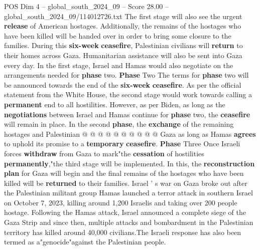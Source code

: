 \begin{textsample}{POS Dim 4 – global\_south\_2024\_09 – Score 28.00 – global\_south\_2024\_09/114012726.txt}
The first stage will also see the urgent \textbf{release} of American hostages.
Additionally, the remains of the hostages who have been killed will be handed over in order to bring some closure to the families.
During this \textbf{six-week} \textbf{ceasefire}, Palestinian civilians will \textbf{return} to their homes across Gaza.
Humanitarian assistance will also be sent into Gaza every day.
In the first stage, Israel and Hamas would also negotiate on the arrangements needed for \textbf{phase} two. \textbf{Phase} Two The terms for \textbf{phase} two will be announced towards the end of the \textbf{six-week} \textbf{ceasefire}.
As per the official statement from the White House, the second stage would work towards calling a \textbf{permanent} end to all hostilities.
However, as per Biden, as long as the \textbf{negotiations} between Israel and Hamas continue for \textbf{phase} two, the \textbf{ceasefire} will remain in place.
In the second \textbf{phase}, the \textbf{exchange} of the remaining hostages and Palestinian @ @ @ @ @ @ @ @ @ @ Gaza as long as Hamas \textbf{agrees} to uphold its promise to a \textbf{temporary} \textbf{ceasefire}. \textbf{Phase} Three Once Israeli forces \textbf{withdraw} from Gaza to mark"the \textbf{cessation} of hostilities \textbf{permanently},"the third stage will be implemented.
In this, the \textbf{reconstruction} \textbf{plan} for Gaza will begin and the final remains of the hostages who have been killed will be \textbf{returned} to their families.
Israel ' s war on Gaza broke out after the Palestinian militant group Hamas launched a terror attack in southern Israel on October 7, 2023, killing around 1,200 Israelis and taking over 200 people hostage.
Following the Hamas attack, Israel announced a complete siege of the Gaza Strip and since then, multiple attacks and bombardment in the Palestinian territory has killed around 40,000 civilians.The Israeli response has also been termed as a"genocide"against the Palestinian people.

\end{textsample}
